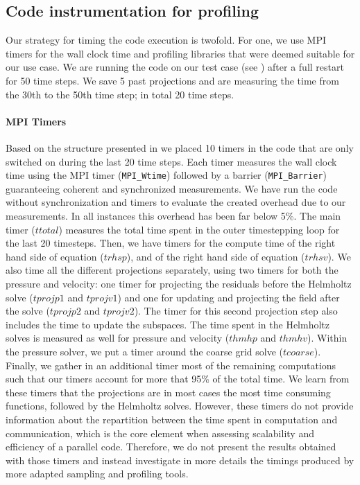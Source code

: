 \documentclass{sig-alternate}
\begin{document}
\subsection{Code instrumentation for profiling}
\label{sec:timers}
Our strategy for timing the code execution is twofold. For one, we use MPI
timers for the wall clock time and profiling libraries that were deemed suitable
for our use case. We are running the code on our test case (see
) after a full restart for 50 time steps. We save 5 past
projections and are measuring the time from the 30th to the 50th time step; in
total 20 time steps.
 
\paragraph{MPI Timers}
Based on the structure presented in  we placed 10 timers in the code that are
only switched on during the last 20 time steps. Each timer measures the wall
clock time using the MPI timer ({\tt MPI\_Wtime}) followed by a barrier
({\tt MPI\_Barrier}) guaranteeing coherent and synchronized measurements. We
have run the code without synchronization and timers to evaluate the created
overhead due to our measurements. In all instances this overhead has been far
below 5\%. The main timer ($ttotal$) measures the total time spent in the outer timestepping loop for the last 20 timesteps. Then, we have timers for the compute time of the right hand side of equation  ($trhsp$), and of the right hand side of equation  ($trhsv$). We also time all the different projections separately, using two timers for both the pressure and velocity: one timer for projecting the residuals before the Helmholtz solve ($tprojp1$ and $tprojv1$) and one for updating and projecting the field after the solve ($tprojp2$ and $tprojv2$). The timer for this second projection step also includes the time to update the subspaces. The time spent in the Helmholtz solves is measured as well for pressure and velocity ($thmhp$ and $thmhv$). Within the pressure solver, we put a timer around the coarse grid solve ($tcoarse$). Finally, we gather in an additional timer most of the remaining computations such that our timers account for more that 95\% of the total time. We learn from these timers that the projections are in most cases the most time consuming functions, followed by the Helmholtz solves. However, these timers do not provide information about the repartition between the time spent in computation and communication, which is the core element when assessing scalability and efficiency of a parallel code. Therefore, we do not present the results obtained with those timers and instead investigate in more details the timings produced by more adapted sampling and profiling tools.
\end{document}

